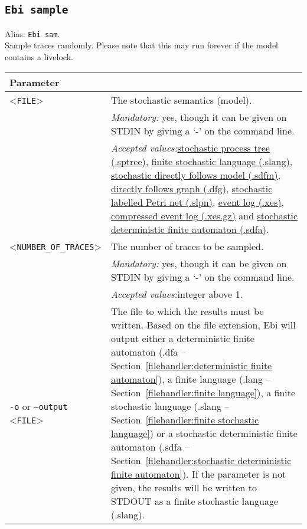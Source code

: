 {\subsection{\texttt{Ebi sample}}
\label{command:Ebi sample}
Alias: \texttt{Ebi sam}.\\
Sample traces randomly. Please note that this may run forever if the model contains a livelock.\\
\begin{tabularx}{\linewidth}{lX}
\toprule
Parameter \\\midrule
<\texttt{FILE}>&The stochastic semantics (model).\\
&\textit{Mandatory:} \quad yes, though it can be given on STDIN by giving a `-' on the command line.\\
&\textit{Accepted values:}\quad \hyperref[filehandler:stochastic process tree]{stochastic process tree (.sptree)}, \hyperref[filehandler:finite stochastic language]{finite stochastic language (.slang)}, \hyperref[filehandler:stochastic directly follows model]{stochastic directly follows model (.sdfm)}, \hyperref[filehandler:directly follows graph]{directly follows graph (.dfg)}, \hyperref[filehandler:stochastic labelled Petri net]{stochastic labelled Petri net (.slpn)}, \hyperref[filehandler:event log]{event log (.xes)}, \hyperref[filehandler:compressed event log]{compressed event log (.xes.gz)} and \hyperref[filehandler:stochastic deterministic finite automaton]{stochastic deterministic finite automaton (.sdfa)}.\\
<\texttt{NUMBER\_OF\_TRACES}>&The number of traces to be sampled.\\
&\textit{Mandatory:} \quad yes, though it can be given on STDIN by giving a `-' on the command line.\\
&\textit{Accepted values:}\quad integer above 1.\\
\texttt{-o} or \texttt{--output} <\texttt{FILE}> &
The file to which the results must be written. Based on the file extension, Ebi will output either a deterministic finite automaton (.dfa -- Section~\ref{filehandler:deterministic finite automaton}), a finite language (.lang -- Section~\ref{filehandler:finite language}), a finite stochastic language (.slang -- Section~\ref{filehandler:finite stochastic language}) or a stochastic deterministic finite automaton (.sdfa -- Section~\ref{filehandler:stochastic deterministic finite automaton}).
If the parameter is not given, the results will be written to STDOUT as a finite stochastic language (.slang).\\

\end{tabularx}}
